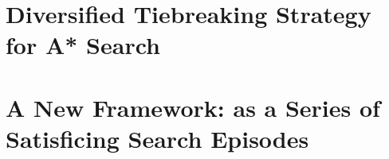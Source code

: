 
\frontmatter

\tableofcontents


\mainmatter
\chapter{Diversified Tiebreaking Strategy for A* Search}








\chapter{A New Framework:  \astar as a Series of Satisficing Search Episodes}








\backmatter


